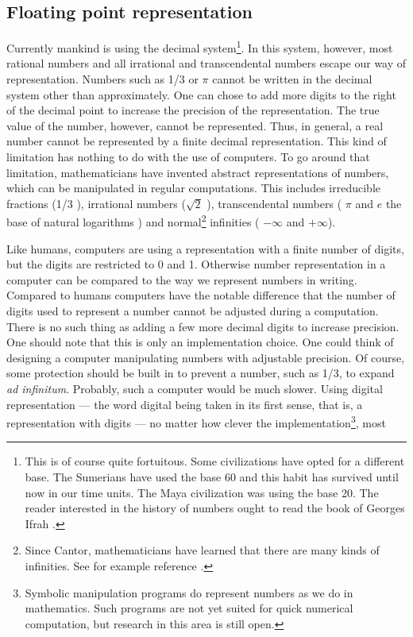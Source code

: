 \documentclass[twoside]{book}
\begin{document}
\subsection{Floating point representation}
Currently mankind is using the decimal system\footnote{This is of
course quite fortuitous. Some civilizations have opted for a
different base. The Sumerians have used the base 60 and this habit
has survived until now in our time units. The Maya civilization
was using the base 20. The reader interested in the history of
numbers ought to read the book of Georges Ifrah \cite{Ifrah}.}. In
this system, however, most rational numbers and all irrational and
transcendental numbers escape our way of representation. Numbers
such as 1/3 or $\pi$ cannot be written in the decimal system other
than approximately. One can chose to add more digits to the right
of the decimal point to increase the precision of the
representation. The true value of the number, however, cannot be
represented. Thus, in general, a real number cannot be represented
by a finite decimal representation. This kind of limitation has
nothing to do with the use of computers. To go around that
limitation, mathematicians have invented abstract representations
of numbers, which can be manipulated in regular computations. This
includes irreducible fractions (1/3 \eg), irrational numbers
($\sqrt{2}$ \eg), transcendental numbers ( $\pi$ and $e$ the base
of natural logarithms \eg) and normal\footnote{Since Cantor,
mathematicians have learned that there are many kinds of
infinities. See for example reference \cite{Gullberg}.} infinities
( $-\infty$ and $+\infty$).
\par
Like humans, computers are using a representation with a finite
number of digits, but the digits are restricted to 0 and 1.
Otherwise number representation in a computer can be compared to
the way we represent numbers in writing. Compared to humans
computers have the notable difference that the number of digits
used to represent a number cannot be adjusted during a
computation. There is no such thing as adding a few more decimal
digits to increase precision. One should note that this is only an
implementation choice. One could think of designing a computer
manipulating numbers with adjustable precision. Of course, some
protection should be built in to prevent a number, such as 1/3, to
expand {\it ad infinitum}. Probably, such a computer would be much
slower. Using digital representation --- the word digital being
taken in its first sense, that is, a representation with digits
--- no matter how clever the implementation\footnote{Symbolic
manipulation programs do represent numbers as we do in
mathematics. Such programs are not yet suited for quick numerical
computation, but research in this area is still open.}, most
\end{document}
